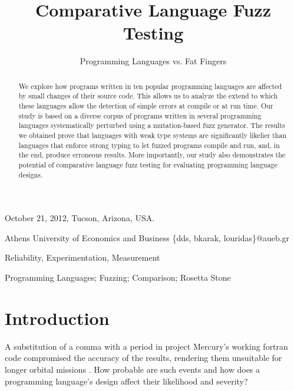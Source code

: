 \documentclass[10pt]{sigplanconf}
\begin{document}
 {October 21, 2012, Tucson, Arizona, USA.}


\title{Comparative Language Fuzz Testing}
\subtitle{Programming Languages vs. Fat Fingers}

  {Athens University of Economics and Business}
  {\{dds, bkarak, louridas\}@aueb.gr}

\maketitle

\begin{abstract}
We explore how programs written in ten popular programming languages
are affected by small changes of their source code.
This allows us to analyze the extend to which these languages
allow the detection of simple errors at compile or at run time.
Our study is based on a diverse corpus of programs written in several programming
languages systematically perturbed using a mutation-based fuzz generator.
The results we obtained
prove that languages with weak type systems are significantly
likelier than languages that enforce strong typing to let fuzzed programs
compile and run, and, in the end, produce erroneous results.
More importantly, our study also demonstrates the potential of comparative
language fuzz testing for evaluating programming language designs.
\end{abstract}


\terms
Reliability, Experimentation, Measurement

\keywords
Programming Languages; Fuzzing; Comparison; Rosetta Stone

\section{Introduction} %
\label{sec:intro}
A substitution of a comma with a period in project Mercury's working
{\sc fortran} code compromised the accuracy of the results,
rendering them unsuitable for longer orbital missions \cite{Brad89,Neu95}.
How probable are such events and how does a programming language's
design affect their likelihood and severity?
\end{document}
